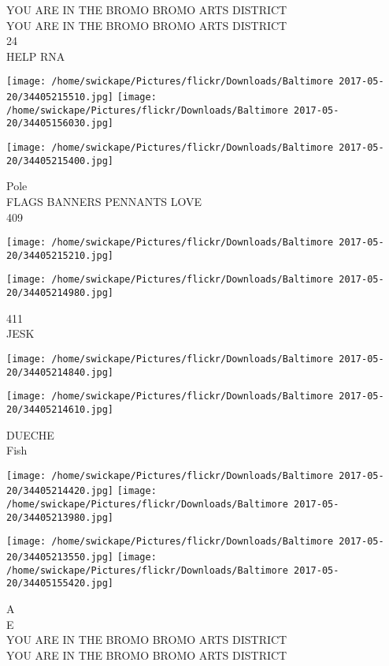 \documentclass[10pt,letterpaper]{article}
\begin{document}
YOU ARE IN THE BROMO BROMO ARTS DISTRICT\\
YOU ARE IN THE BROMO BROMO ARTS DISTRICT\\
24\\
HELP RNA\\
\pagebreak

\texttt{[image: /home/swickape/Pictures/flickr/Downloads/Baltimore 2017-05-20/34405215510.jpg]}
\texttt{[image: /home/swickape/Pictures/flickr/Downloads/Baltimore 2017-05-20/34405156030.jpg]}

\vspace{0.25in}
\texttt{[image: /home/swickape/Pictures/flickr/Downloads/Baltimore 2017-05-20/34405215400.jpg]}

Pole\\
FLAGS BANNERS PENNANTS LOVE\\
409\\
\pagebreak

\texttt{[image: /home/swickape/Pictures/flickr/Downloads/Baltimore 2017-05-20/34405215210.jpg]}

\vspace{0.25in}
\texttt{[image: /home/swickape/Pictures/flickr/Downloads/Baltimore 2017-05-20/34405214980.jpg]}

411\\
JESK\\
\pagebreak

\texttt{[image: /home/swickape/Pictures/flickr/Downloads/Baltimore 2017-05-20/34405214840.jpg]}

\vspace{0.25in}
\texttt{[image: /home/swickape/Pictures/flickr/Downloads/Baltimore 2017-05-20/34405214610.jpg]}

DUECHE\\
Fish\\
\pagebreak

\texttt{[image: /home/swickape/Pictures/flickr/Downloads/Baltimore 2017-05-20/34405214420.jpg]}
\texttt{[image: /home/swickape/Pictures/flickr/Downloads/Baltimore 2017-05-20/34405213980.jpg]}

\texttt{[image: /home/swickape/Pictures/flickr/Downloads/Baltimore 2017-05-20/34405213550.jpg]}
\texttt{[image: /home/swickape/Pictures/flickr/Downloads/Baltimore 2017-05-20/34405155420.jpg]}

A\\
E\\
YOU ARE IN THE BROMO BROMO ARTS DISTRICT\\
YOU ARE IN THE BROMO BROMO ARTS DISTRICT\\
\pagebreak
\end{document}
